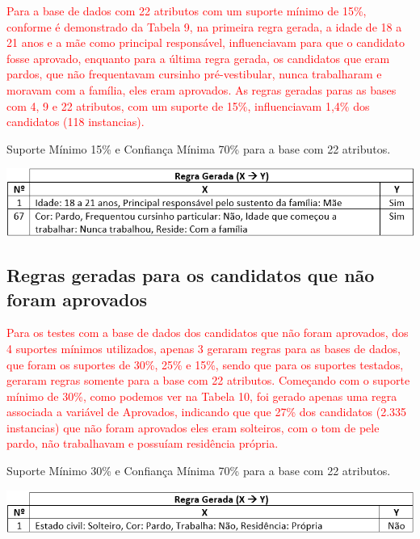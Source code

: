 \par
\textcolor{red}{Para a base de dados com 22 atributos com um suporte mínimo de 15\%, conforme é demonstrado da Tabela 9, na primeira regra gerada, a idade de 18 a 21 anos e a mãe como principal responsável, influenciavam para que o candidato fosse aprovado, enquanto para a última regra gerada, os candidatos que eram pardos, que não frequentavam cursinho pré-vestibular, nunca trabalharam e moravam com a família, eles eram aprovados. As regras geradas paras as bases com 4, 9 e 22 atributos, com um suporte de 15\%, influenciavam 1,4\% dos candidatos (118 instancias).}

\par
\begin{table}[!htp]
	\begin{center}
    \caption{\label{fig:waveform_fig} Suporte Mínimo 15\% e Confiança Mínima 70\% para a base com 22 atributos.}
	\includegraphics[scale=0.75]{Figuras/Suporte_15_atributos_22.png}
	\end{center}
\end{table}



\subsection{Regras geradas para os candidatos que não foram aprovados}


\par
\textcolor{red}{Para os testes com a base de dados dos candidatos que não foram aprovados, dos 4 suportes mínimos utilizados, apenas 3 geraram regras para as bases de dados, que foram os suportes de 30\%, 25\% e 15\%, sendo que para os suportes testados, geraram regras somente para a base com 22 atributos. Começando com o suporte mínimo de 30\%, como podemos ver na Tabela 10, foi gerado apenas uma regra associada a variável de Aprovados, indicando que que 27\% dos candidatos (2.335 instancias) que não foram aprovados eles eram solteiros, com o tom de pele pardo, não trabalhavam e possuíam residência própria.}


\par
\begin{table}[!htp]
	\begin{center}
    \caption{\label{fig:waveform_fig} Suporte Mínimo 30\% e Confiança Mínima 70\% para a base com 22 atributos.}
	\includegraphics[scale=0.75]{Figuras/Suporte_30_Nao_atributos_22.png}
	\end{center}
\end{table}

